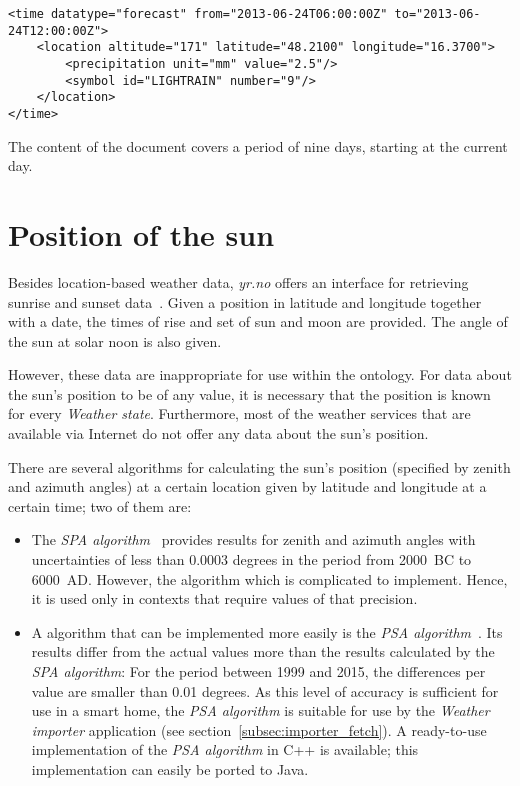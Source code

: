 \begin{lstlisting}
<time datatype="forecast" from="2013-06-24T06:00:00Z" to="2013-06-24T12:00:00Z">
	<location altitude="171" latitude="48.2100" longitude="16.3700">
		<precipitation unit="mm" value="2.5"/>
		<symbol id="LIGHTRAIN" number="9"/>
	</location>
</time>
\end{lstlisting}

The content of the  document covers a period of nine days, starting at the current day.

\section{Position of the sun}
\label{sec:sun_position}

Besides location-based weather data, \emph{yr.no} offers an interface for retrieving sunrise and sunset data~\cite{yrno_sunrise}. Given a position in latitude and longitude together with a date, the times of rise and set of sun and moon are provided. The angle of the sun at solar noon is also given.

However, these data are inappropriate for use within the \smarthomeweather ontology. For data about the sun's position to be of any value, it is necessary that the position is known for every \emph{Weather state}. Furthermore, most of the weather services that are available via Internet do not offer any data about the sun's position.

There are several algorithms for calculating the sun's position (specified by zenith and azimuth angles) at a certain location given by latitude and longitude at a certain time; two of them are:

\begin{itemize}
  \item The \emph{SPA algorithm}~\cite{SPA_algorithm} provides results for zenith and azimuth angles with uncertainties of less than \num{0.0003} degrees in the period from 2000~BC to 6000~AD. However, the algorithm which is complicated to implement. Hence, it is used only in contexts that require values of that precision.
  
  \item A algorithm that can be implemented more easily is the \emph{PSA algorithm}~\cite{PSA_algorithm}. Its results differ from the actual values more than the results calculated by the \emph{SPA algorithm}: For the period between 1999 and 2015, the differences per value are smaller than \num{0.01} degrees. As this level of accuracy is sufficient for use in a smart home, the \emph{PSA algorithm} is suitable for use by the \emph{Weather importer} application (see section~\ref{subsec:importer_fetch}). A ready-to-use implementation of the \emph{PSA algorithm} in C++ is available; this implementation can easily be ported to Java.
\end{itemize}
